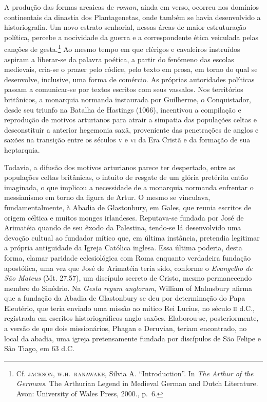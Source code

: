 A produção das formas arcaicas de \textit{roman}, ainda em verso,
ocorreu nos domínios continentais da dinastia dos Plantagenetas, onde
também se havia desenvolvido a historiografia. Um novo estrato
senhorial, nessas áreas de maior estruturação política, percebe a
nocividade da guerra e a correspondente ética veiculada pelas canções
de gesta.\footnote{ Cf. \textsc{jackson}, \textsc{w.h.~ranawake}, Silvia A.
“Introduction”. In \textit{The Arthur of the Germans}. The Arthurian
Legend in Medieval German and Dutch Literature. Avon: University of
Wales Press, 2000., p.~6.} Ao mesmo tempo em que clérigos e
cavaleiros instruídos aspiram a liberar-se da palavra poética, a partir
do fenômeno das escolas medievais, cria-se o prazer pelo códice, pelo
texto em prosa, em torno do qual se desenvolve, inclusive, uma forma de
comércio. As próprias autoridades políticas passam a comunicar-se por
textos escritos com seus vassalos. Nos territórios britânicos, a
monarquia normanda instaurada por Guilherme, o Conquistador, desde seu
triunfo na Batalha de Hastings (1066), incentivou a compilação e
reprodução de motivos arturianos para atrair a simpatia das populações
celtas e desconstituir a anterior hegemonia saxã, proveniente das
penetrações de anglos e saxões na transição entre os séculos \textsc{v} e \textsc{vi} da
Era Cristã e da formação de sua heptarquia. 

Todavia, a difusão dos motivos arturianos parece ter despertado, entre
as populações celtas britânicas, o intuito de resgate de um glória
pretérita então imaginada, o que implicou a necessidade de a monarquia
normanda enfrentar o messianismo em torno da figura de Artur. O mesmo
se vinculava, fundamentalmente, à Abadia de Glastonbury, em Gales, que
reunia escritos de origem céltica e muitos monges irlandeses.
Reputava-se fundada por José de Arimatéia quando de seu êxodo da
Palestina, tendo-se lá desenvolvido uma devoção cultual ao fundador
mítico que, em última instância, pretendia legitimar a própria
antiguidade da Igreja Católica inglesa. Essa última poderia, desta
forma, clamar paridade eclesiológica com Roma enquanto verdadeira
fundação apostólica, uma vez que José de Arimatéia teria sido, conforme
o \textit{Evangelho de São Mateus} (Mt. 27,57), um discípulo secreto de
Cristo, mesmo permanecendo membro do Sinédrio. Na \textit{Gesta regum
anglorum}, William of Malmsbury afirma que a fundação da Abadia de
Glastonbury se deu por determinação do Papa Eleutério, que teria
enviado uma missão ao mítico Rei Lucius, no século \textsc{ii} d.C., registrada
em escritos historiográficos anglo-saxões. Elaborou-se, posteriormente,
a versão de que dois missionários, Phagan e Deruvian, teriam
encontrado, no local da abadia, uma igreja pretensamente fundada por
discípulos de São Felipe e São Tiago, em 63 d.C.

